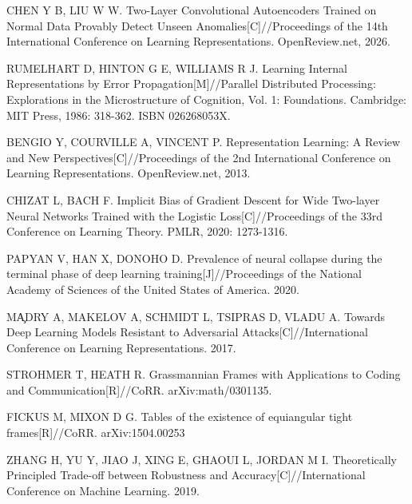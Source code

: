  CHEN Y B, LIU W W. Two-Layer Convolutional Autoencoders Trained on Normal Data Provably Detect Unseen Anomalies[C]//Proceedings of the 14th International Conference on Learning Representations. OpenReview.net, 2026.

 RUMELHART D, HINTON G E, WILLIAMS R J. Learning Internal Representations by Error Propagation[M]//Parallel Distributed Processing: Explorations in the Microstructure of Cognition, Vol. 1: Foundations. Cambridge: MIT Press, 1986: 318-362. ISBN 026268053X.

 BENGIO Y, COURVILLE A, VINCENT P. Representation Learning: A Review and New Perspectives[C]//Proceedings of the 2nd International Conference on Learning Representations. OpenReview.net, 2013.

 CHIZAT L, BACH F. Implicit Bias of Gradient Descent for Wide Two-layer Neural Networks Trained with the Logistic Loss[C]//Proceedings of the 33rd Conference on Learning Theory. PMLR, 2020: 1273-1316.

 PAPYAN V, HAN X, DONOHO D. Prevalence of neural collapse during the terminal phase of deep learning training[J]//Proceedings of the National Academy of Sciences of the United States of America. 2020.

 MA̧DRY A, MAKELOV A, SCHMIDT L, TSIPRAS D, VLADU A. Towards Deep Learning Models Resistant to Adversarial Attacks[C]//International Conference on Learning Representations. 2017.

 STROHMER T, HEATH R. Grassmannian Frames with Applications to Coding and Communication[R]//CoRR.  arXiv:math/0301135.

 FICKUS M, MIXON D G. Tables of the existence of equiangular tight frames[R]//CoRR. arXiv:1504.00253

 ZHANG H, YU Y, JIAO J, XING E, GHAOUI L, JORDAN M I. Theoretically Principled Trade-off between Robustness and Accuracy[C]//International Conference on Machine Learning. 2019.
